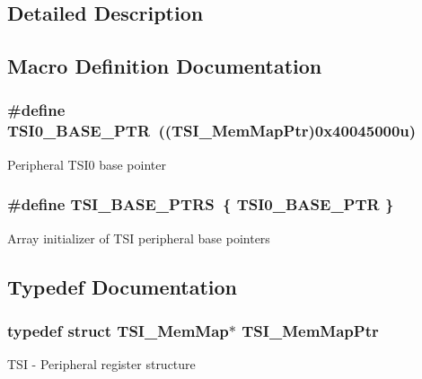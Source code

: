\subsection{Detailed Description}


\subsection{Macro Definition Documentation}
\hypertarget{group___t_s_i___peripheral_gaf98ea1cd15559446e0cfc1ae177751f6}{}
\subsubsection[{T\+S\+I0\+\_\+\+B\+A\+S\+E\+\_\+\+P\+T\+R}]{\setlength{\rightskip}{0pt plus 5cm}\#define T\+S\+I0\+\_\+\+B\+A\+S\+E\+\_\+\+P\+T\+R~(({\bf T\+S\+I\+\_\+\+Mem\+Map\+Ptr})0x40045000u)}\label{group___t_s_i___peripheral_gaf98ea1cd15559446e0cfc1ae177751f6}
Peripheral T\+S\+I0 base pointer \hypertarget{group___t_s_i___peripheral_gaf0e643a8dc882d5a89dd6bb9a4ca3d16}{}
\subsubsection[{T\+S\+I\+\_\+\+B\+A\+S\+E\+\_\+\+P\+T\+R\+S}]{\setlength{\rightskip}{0pt plus 5cm}\#define T\+S\+I\+\_\+\+B\+A\+S\+E\+\_\+\+P\+T\+R\+S~\{ {\bf T\+S\+I0\+\_\+\+B\+A\+S\+E\+\_\+\+P\+T\+R} \}}\label{group___t_s_i___peripheral_gaf0e643a8dc882d5a89dd6bb9a4ca3d16}
Array initializer of T\+S\+I peripheral base pointers 

\subsection{Typedef Documentation}
\hypertarget{group___t_s_i___peripheral_gad1310fedc6b594554cdd760e371de570}{}
\subsubsection[{T\+S\+I\+\_\+\+Mem\+Map\+Ptr}]{\setlength{\rightskip}{0pt plus 5cm}typedef struct {\bf T\+S\+I\+\_\+\+Mem\+Map}$\ast$ {\bf T\+S\+I\+\_\+\+Mem\+Map\+Ptr}}\label{group___t_s_i___peripheral_gad1310fedc6b594554cdd760e371de570}
T\+S\+I -\/ Peripheral register structure 